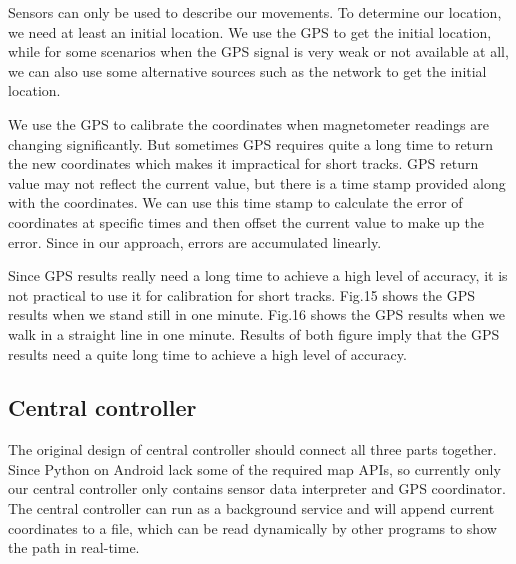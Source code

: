 \documentclass[journal]{IEEEtran}
\begin{document}
Sensors can only be used to describe our movements.
To determine our location, we need at least an initial location.
We use the GPS to get the initial location, while for some scenarios when the GPS signal is very weak or not available at all, we can also use some alternative sources such as the network to get the initial location.

We use the GPS to calibrate the coordinates when magnetometer readings are changing significantly.
But sometimes GPS requires quite a long time to return the new coordinates which makes it impractical for short tracks.
GPS return value may not reflect the current value, but there is a time stamp provided along with the coordinates. 
We can use this time stamp to calculate the error of coordinates at specific times and then offset the current value to make up the error. 
Since in our approach, errors are accumulated linearly.

Since GPS results really need a long time to achieve a high level of accuracy, it is not practical to use it for calibration for short tracks.
Fig.15 shows the GPS results when we stand still in one minute. 
Fig.16 shows the GPS results when we walk in a straight line in one minute.
Results of both figure imply that the GPS results need a quite long time to achieve a high level of accuracy.

\subsection{Central controller}
The original design of central controller should connect all three parts together.
Since Python on Android lack some of the required map APIs, so currently only our central controller only contains sensor data interpreter and GPS coordinator.
The central controller can run as a background service and will append current coordinates to a file, which can be read dynamically by other programs to show the path in real-time.
\end{document}
